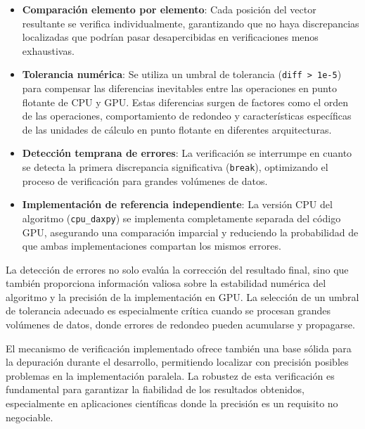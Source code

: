             \begin{itemize}
            
                \item \textbf{Comparación elemento por elemento}: Cada posición del vector resultante se verifica individualmente, garantizando que no haya discrepancias localizadas que podrían pasar desapercibidas en verificaciones menos exhaustivas.
                
                \item \textbf{Tolerancia numérica}: Se utiliza un umbral de tolerancia (\texttt{diff > 1e-5}) para compensar las diferencias inevitables entre las operaciones en punto flotante de CPU y GPU. Estas diferencias surgen de factores como el orden de las operaciones, comportamiento de redondeo y características específicas de las unidades de cálculo en punto flotante en diferentes arquitecturas.
                
                \item \textbf{Detección temprana de errores}: La verificación se interrumpe en cuanto se detecta la primera discrepancia significativa (\texttt{break}), optimizando el proceso de verificación para grandes volúmenes de datos.
                
                \item \textbf{Implementación de referencia independiente}: La versión CPU del algoritmo (\texttt{cpu\_daxpy}) se implementa completamente separada del código GPU, asegurando una comparación imparcial y reduciendo la probabilidad de que ambas implementaciones compartan los mismos errores.
                
            \end{itemize}
            
            La detección de errores no solo evalúa la corrección del resultado final, sino que también proporciona información valiosa sobre la estabilidad numérica del algoritmo y la precisión de la implementación en GPU. La selección de un umbral de tolerancia adecuado es especialmente crítica cuando se procesan grandes volúmenes de datos, donde errores de redondeo pueden acumularse y propagarse.
            
            El mecanismo de verificación implementado ofrece también una base sólida para la depuración durante el desarrollo, permitiendo localizar con precisión posibles problemas en la implementación paralela. La robustez de esta verificación es fundamental para garantizar la fiabilidad de los resultados obtenidos, especialmente en aplicaciones científicas donde la precisión es un requisito no negociable.
            
